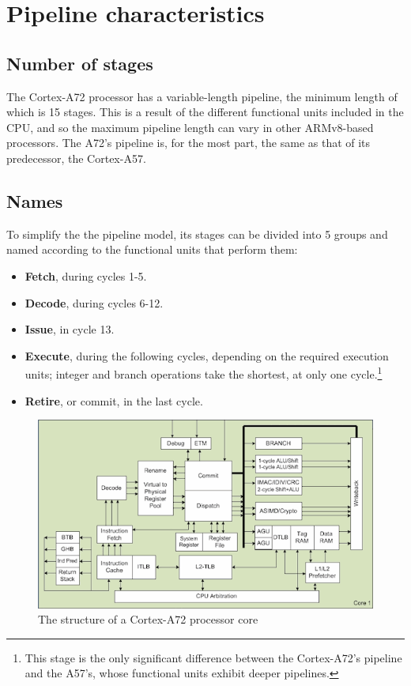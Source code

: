 \section{Pipeline characteristics}
\subsection*{Number of stages}
\hspace{\parindent}The Cortex-A72 processor has a variable-length pipeline, the minimum length of which is 15 stages. This is a result of the different functional units included in the CPU, and so the maximum pipeline length can vary in other ARMv8-based processors. \cite{pipeline} The A72's pipeline is, for the most part, the same as that of its predecessor, the Cortex-A57.
\subsection*{Names}
\hspace{\parindent}To simplify the the pipeline model, its stages can be divided into 5 groups and named according to the functional units that perform them: \cite{pipeline}
\begin{itemize}
	\item \textbf{Fetch}, during cycles 1-5.
	\item \textbf{Decode}, during cycles 6-12.
	\item \textbf{Issue}, in cycle 13.
	\item \textbf{Execute}, during the following cycles, depending on the required execution units; integer and branch operations take the shortest, at only one cycle.\footnote{This stage is the only significant difference between the Cortex-A72's pipeline and the A57's, whose functional units exhibit deeper pipelines.}
	\item \textbf{Retire}, or commit, in the last cycle.
\end{itemize}
\hspace{\parindent}
\begin{figure}[H]
	\begin{center}
		\includegraphics[width=0.7\linewidth]{imgs/a72pipeline.png}
		\caption{The structure of a Cortex-A72 processor core}
	\end{center}
\end{figure}
\pagebreak{}
